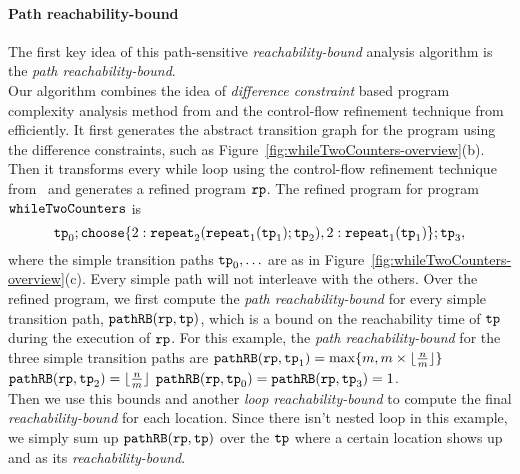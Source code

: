 \paragraph{Path reachability-bound}
The first key idea of this path-sensitive \emph{reachability-bound} analysis algorithm is the \emph{path reachability-bound}.
\\
Our algorithm combines the idea of \emph{difference constraint} based program complexity analysis method from \cite{sinn2017complexity}
and the control-flow refinement technique from~\cite{GulwaniJK09} efficiently.
It first
generates the abstract transition graph for the program using the difference constraints, such as Figure~\ref{fig:whileTwoCounters-overview}(b).
Then it transforms every while loop using the control-flow refinement technique from~\cite{GulwaniJK09} and generates a refined program $\mathtt{rp}$.
% 
The refined program for program $\mathtt{whileTwoCounters}$ is
\[
  \tpath_0 ; 
  \rpchoose{2: \rprepeat_2(\rprepeat_1(\tpath_1); \tpath_2) , 
  2: \rprepeat_1(\tpath_1) }; \tpath_3,
\]
where the simple transition paths $\mathtt{tp}_0, \ldots$ are as in Figure~\ref{fig:whileTwoCounters-overview}(c).
Every simple path will not interleave with the others. 
Over the refined program, we first compute the \emph{path reachability-bound} for every simple transition path,
$\mathtt{pathRB}(\mathtt{rp}, \mathtt{tp})$,
which is a bound on the reachability time of $\mathtt{tp}$ during the execution of $\mathtt{rp}$.
For this example, the \emph{path reachability-bound} for the three simple transition paths are
$\mathtt{pathRB}(\mathtt{rp}, \mathtt{tp}_1) = \max\{m, m \times \lfloor\frac{n}{m}\rfloor\}$ \quad
$\mathtt{pathRB}(\mathtt{rp}, \mathtt{tp}_2) = \lfloor\frac{n}{m}\rfloor$ \quad
$\mathtt{pathRB}(\mathtt{rp}, \mathtt{tp}_0) = \mathtt{pathRB}(\mathtt{rp}, \mathtt{tp}_3) = 1$.
\\
Then we use this bounds
and another \emph{loop reachability-bound}
to compute the final \emph{reachability-bound} for each location.
Since there isn't nested loop in this example, we simply sum up $\mathtt{pathRB}(\mathtt{rp}, \mathtt{tp})$ over the $\mathtt{tp}$ where a certain location shows up
and as its \emph{reachability-bound}.
%
